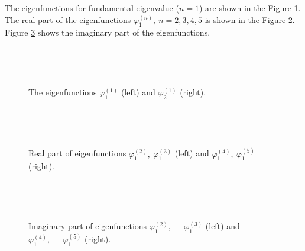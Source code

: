 \documentclass[authoryear]{elsarticle}
\begin{document}
The eigenfunctions for fundamental eigenvalue ($n=1$) are shown in the Figure \ref{fig:14}.
The real part of the eigenfunctions $\varphi^{(n)}_1, \ n = 2,3,4,5$ is shown in the Figure \ref{fig:15}.
Figure \ref{fig:16} shows the imaginary part of the eigenfunctions.

\begin{figure}[h]
  \begin{center}
\begin{minipage}{0.49\linewidth}
 \\
\end{minipage}
\hfill
\begin{minipage}{0.49\linewidth}
 \\
\end{minipage}
\caption{The eigenfunctions $\varphi^{(1)}_1$ (left) and $\varphi^{(1)}_2$ (right).}
\label{fig:14}
  \end{center}
\end{figure}

\begin{figure}[h]
  \begin{center}
\begin{minipage}{0.49\linewidth}
 \\
\end{minipage}
\hfill
\begin{minipage}{0.49\linewidth}
 \\
\end{minipage}
\caption{Real part of eigenfunctions $\varphi^{(2)}_1, \ \varphi^{(3)}_1$ (left) and $\varphi^{(4)}_1, \ \varphi^{(5)}_1$ (right).}
\label{fig:15}
  \end{center}
\end{figure}

\begin{figure}[h]
  \begin{center}
\begin{minipage}{0.49\linewidth}
 \\
\end{minipage}
\hfill
\begin{minipage}{0.49\linewidth}
 \\
\end{minipage}
\caption{Imaginary part of eigenfunctions $\varphi^{(2)}_1, \ - \varphi^{(3)}_1$ (left) and $\varphi^{(4)}_1, \ - \varphi^{(5)}_1$ (right).}
\label{fig:16}
  \end{center}
\end{figure}
\end{document}
